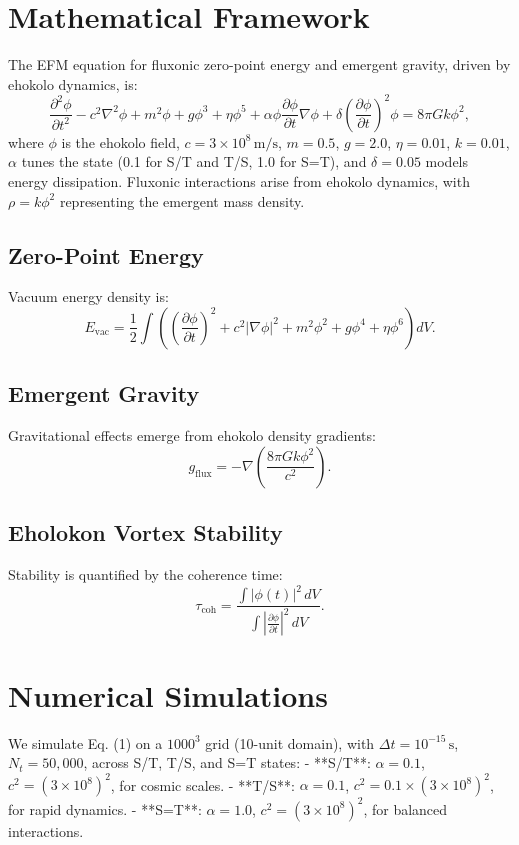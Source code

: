 \documentclass[11pt]{article}
\begin{document}
\section{Mathematical Framework}
The EFM equation for fluxonic zero-point energy and emergent gravity, driven by ehokolo dynamics, is:
\begin{equation}
\frac{\partial^2 \phi}{\partial t^2} - c^2 \nabla^2 \phi + m^2 \phi + g \phi^3 + \eta \phi^5 + \alpha \phi \frac{\partial \phi}{\partial t} \nabla \phi + \delta \left(\frac{\partial \phi}{\partial t}\right)^2 \phi = 8 \pi G k \phi^2,
\end{equation}
where \(\phi\) is the ehokolo field, \(c = 3 \times 10^8 \, \text{m/s}\), \(m = 0.5\), \(g = 2.0\), \(\eta = 0.01\), \(k = 0.01\), \(\alpha\) tunes the state (0.1 for S/T and T/S, 1.0 for S=T), and \(\delta = 0.05\) models energy dissipation. Fluxonic interactions arise from ehokolo dynamics, with \(\rho = k \phi^2\) representing the emergent mass density.

\subsection{Zero-Point Energy}
Vacuum energy density is:
\begin{equation}
E_{\text{vac}} = \frac{1}{2} \int \left( \left(\frac{\partial \phi}{\partial t}\right)^2 + c^2 |\nabla \phi|^2 + m^2 \phi^2 + g \phi^4 + \eta \phi^6 \right) dV.
\end{equation}

\subsection{Emergent Gravity}
Gravitational effects emerge from ehokolo density gradients:
\begin{equation}
g_{\text{flux}} = - \nabla \left( \frac{8 \pi G k \phi^2}{c^2} \right).
\end{equation}

\subsection{Eholokon Vortex Stability}
Stability is quantified by the coherence time:
\begin{equation}
\tau_{\text{coh}} = \frac{\int |\phi(t)|^2 \, dV}{\int \left| \frac{\partial \phi}{\partial t} \right|^2 \, dV}.
\end{equation}

\section{Numerical Simulations}
We simulate Eq. (1) on a $1000^3$ grid (10-unit domain), with \(\Delta t = 10^{-15} \, \text{s}\), \(N_t = 50,000\), across S/T, T/S, and S=T states:
- **S/T**: \(\alpha = 0.1\), \(c^2 = (3 \times 10^8)^2\), for cosmic scales.
- **T/S**: \(\alpha = 0.1\), \(c^2 = 0.1 \times (3 \times 10^8)^2\), for rapid dynamics.
- **S=T**: \(\alpha = 1.0\), \(c^2 = (3 \times 10^8)^2\), for balanced interactions.
\end{document}
